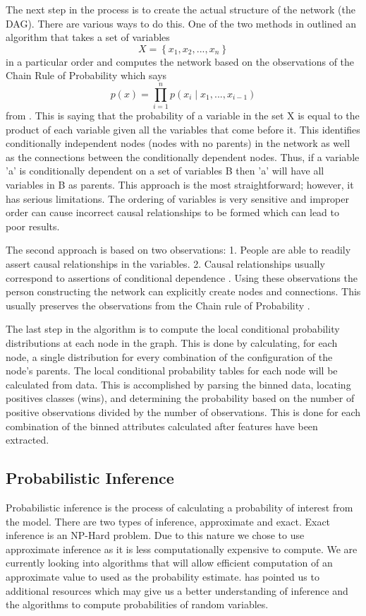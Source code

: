 \documentclass{acm_proc_article-sp}
\begin{document}
The next step in the process is to create the actual structure of the network (the DAG). There are 
various ways to do this. One of the two methods in \cite{heckerman} outlined an algorithm that takes 
a set of variables
\begin{equation}
X=\left\{x_{1},x_{2},...,x_{n}\right\}
\end{equation}
in a particular order and computes the network based on 
the observations of the Chain Rule of Probability which says 
\begin{equation}
p(x)=\prod_{i=1}^{n}p(x_{i} \mid x_{1},...,x_{i-1})
\end{equation} from \cite{heckerman}. This is saying that the 
probability of a variable in the set X is equal to the 
product of each variable given all the variables that come before it. This identifies conditionally 
independent nodes (nodes with no parents) in the network as well as the connections between the 
conditionally dependent nodes. Thus, if a variable 'a' is conditionally dependent on a set of 
variables B then 'a' will have all variables in B as parents. This approach is the most 
straightforward; however, it has serious limitations. The ordering of variables is very sensitive 
and improper order can cause incorrect causal relationships to be formed which can lead to poor 
results.

The second approach is based on two observations: 1. People are able to readily assert causal 
relationships in the variables. 2. Causal relationships usually correspond to assertions of 
conditional dependence \cite{heckerman}. Using these observations the person constructing the 
network can explicitly create nodes and connections. This usually preserves the observations from 
the Chain rule of Probability \cite{heckerman}.

The last step in the algorithm is to compute the local conditional probability distributions at each 
node in the graph. This is done by calculating, for each node, a single distribution for every 
combination of the configuration of the node's parents. The local conditional probability tables for 
each node will be calculated from data. This is accomplished by parsing the binned data, locating 
positives classes (wins), and determining the probability based on the number of positive 
observations divided by the number of observations. This is done for each combination of the binned 
attributes calculated after features have been extracted.
\subsection{Probabilistic Inference}
Probabilistic inference is the process of calculating a probability of interest from the model. 
There are two types of inference, approximate and exact. Exact inference is an NP-Hard problem. Due 
to this nature we chose to use approximate inference as it is less computationally expensive to 
compute. We are currently looking into algorithms that will allow efficient computation of an 
approximate value to used as the probability estimate. \cite{heckerman} has pointed us to additional 
resources which may give us a better understanding of inference and the algorithms to compute probabilities of random variables.
\end{document}
